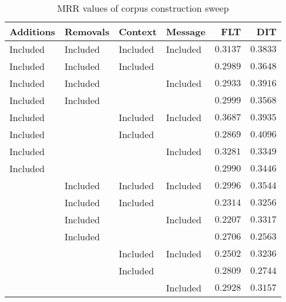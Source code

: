 
\begin{table}
\begin{spacing}{1.2}
\centering
\caption{MRR values of \openjpa corpus construction sweep}
\label{table:openjpa_corpus_sweep}
\vspace{0.2em}
\begin{tabular}{llll|rr}
\toprule
Additions &  Removals &   Context &   Message &           FLT &           DIT \\
\midrule
 Included &  Included &  Included &  Included &      $0.3137$ &      $0.3833$ \\
 \myrowcolor Included &  Included &  Included &           &      $0.2989$ &      $0.3648$ \\
 Included &  Included &           &  Included &      $0.2933$ &      $0.3916$ \\
 Included &  Included &           &           &      $0.2999$ &      $0.3568$ \\
 Included &           &  Included &  Included & $\bm{0.3687}$ &      $0.3935$ \\
 Included &           &  Included &           &      $0.2869$ & $\bm{0.4096}$ \\
 Included &           &           &  Included &      $0.3281$ &      $0.3349$ \\
 Included &           &           &           &      $0.2990$ &      $0.3446$ \\
          &  Included &  Included &  Included &      $0.2996$ &      $0.3544$ \\
          &  Included &  Included &           &      $0.2314$ &      $0.3256$ \\
          &  Included &           &  Included &      $0.2207$ &      $0.3317$ \\
          &  Included &           &           &      $0.2706$ &      $0.2563$ \\
          &           &  Included &  Included &      $0.2502$ &      $0.3236$ \\
          &           &  Included &           &      $0.2809$ &      $0.2744$ \\
          &           &           &  Included &      $0.2928$ &      $0.3157$ \\
\bottomrule
\end{tabular}

\end{spacing}
\end{table}

